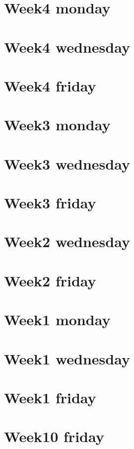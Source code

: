 
\section*{Week4 monday}

\vfill
\section*{Week4 wednesday}

\vfill
\section*{Week4 friday}

\vfill
\section*{Week3 monday}

\vfill
\section*{Week3 wednesday}

\vfill
\section*{Week3 friday}

\vfill
\section*{Week2 wednesday}

\vfill
\section*{Week2 friday}

\vfill
\section*{Week1 monday}

\vfill
\section*{Week1 wednesday}

\vfill
\section*{Week1 friday}

\vfill
\section*{Week10 friday}

\vfill
